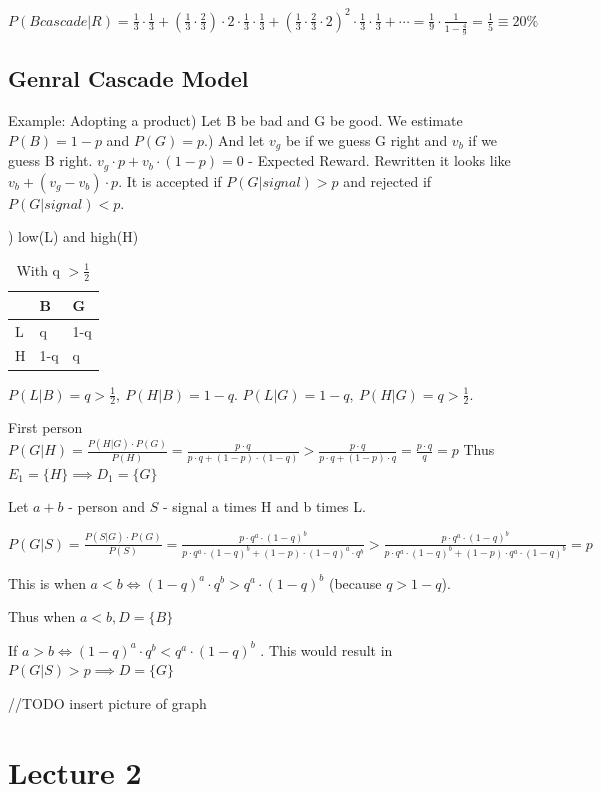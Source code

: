 \documentclass[12pt]{scrartcl}
\begin{document}
\noindent$P(B cascade| R) = \frac{1}{3}\cdot \frac{1}{3} + (\frac{1}{3}\cdot \frac{2}{3})\cdot 2\cdot \frac{1}{3}\cdot \frac{1}{3} + 
(\frac{1}{3}\cdot \frac{2}{3}\cdot 2)^{2}\cdot \frac{1}{3}\cdot \frac{1}{3} + \cdots
= \frac{1}{9}\cdot \frac{1}{1 - \frac{4}{9}} = \frac{1}{5} \equiv 20\%$
\subsection{Genral Cascade Model}
Example: Adopting a product) Let B be bad and G be good. We estimate $P(B) = 1-p$ and $P(G) = p$.) And let $v_{g}$ be if we guess G right and $v_{b}$ if we guess B right.\newline
$v_{g}\cdot p + v_{b}\cdot (1-p) = 0$ - Expected Reward. Rewritten it looks like $v_{b} + (v_{g} - v_{b})\cdot p$.\newline
It is accepted if $P(G|signal) > p$ and rejected if $P(G | signal) < p$.

) low(L) and high(H)
\begin{table}[h]
\centering
\begin{tabular}{|l|l|l|}
\hline
  & B   & G   \\\hline
L & q   & 1-q \\\hline
H & 1-q & q  \\\hline
\end{tabular}
\caption{With q $> \frac{1}{2}$}
\label{my-label}
\end{table}

\noindent $P(L|B) = q > \frac{1}{2},\ P(H|B) = 1-q$. $P(L|G) = 1-q,\ P(H|G) = q > \frac{1}{2}$.\newline

\noindent First person $P(G|H) = \frac{P(H|G)\cdot P(G)}{P(H)} = \frac{p\cdot q}{p\cdot q + (1-p)\cdot (1-q)} > \frac{p\cdot q}{p\cdot q + (1-p)\cdot q} = \frac{p\cdot q}{q} = p$\newline
Thus $E_{1} = \{H\}\implies D_{1} = \{G\}$\newline

\noindent Let $a+b$ - person and $S$ - signal a times H and b times L.

\noindent $P(G|S) = \frac{P(S|G)\cdot P(G)}{P(S)} = \frac{p\cdot q^{a}\cdot (1-q)^{b}}{p\cdot q^{a}\cdot (1-q)^{b} + (1-p)\cdot (1-q)^{a}\cdot q^{b}} > \frac{p\cdot q^{a}\cdot (1-q)^{b}}{p\cdot q^{a}\cdot (1-q)^{b} + (1-p)\cdot q^{a}\cdot (1-q)^{b}} = p$

\noindent This is when $a < b \iff (1-q)^{a}\cdot q^{b} > q^{a}\cdot (1-q)^{b}$ (because $q>1-q$). 

\noindent Thus when $a < b, D = \{B\}$

\noindent If $a > b \iff (1-q)^{a}\cdot q^{b} < q^{a}\cdot (1-q)^{b}$ . This would result in $P(G|S) > p \implies D = \{G\}$

//TODO insert picture of graph

\newpage
\section{Lecture 2} 
\end{document}
